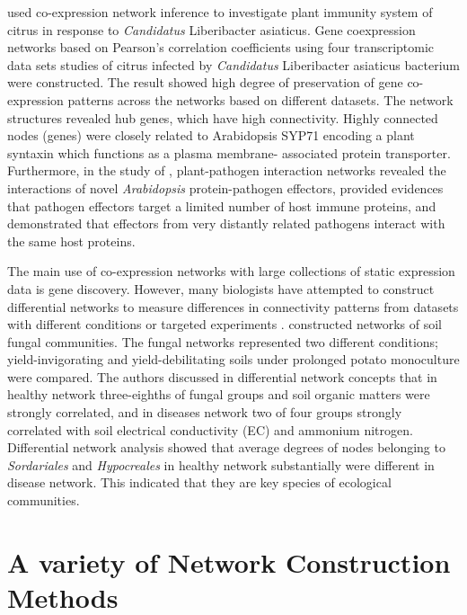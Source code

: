 \citet{Zheng2013} used co-expression network inference to investigate plant immunity system of citrus in response to \textit{Candidatus} Liberibacter asiaticus. Gene coexpression networks based on Pearson's correlation coefficients using four transcriptomic data sets studies of citrus infected by \textit{Candidatus} Liberibacter asiaticus bacterium were constructed. The result showed high degree of preservation of gene co-expression patterns across the networks based on different datasets. The network structures revealed hub genes, which have high connectivity. Highly connected nodes (genes) were closely related to Arabidopsis SYP71 encoding a plant syntaxin which functions as a plasma membrane- associated protein transporter. Furthermore, in the study of \citet{mukhtar2011independently}, plant-pathogen interaction networks revealed the interactions of novel \textit{Arabidopsis} protein-pathogen effectors, provided evidences that pathogen effectors target a limited number of host immune proteins, and demonstrated that effectors from very distantly related pathogens interact with the same host proteins. 

The main use of co-expression networks with large collections of static expression data is gene discovery. However, many biologists have attempted to construct differential networks to measure differences in connectivity patterns from datasets with different conditions or targeted experiments \citep{Toubiana:2013cv}. \citet{Lu:2013hga} constructed networks of soil fungal communities. The fungal networks represented two different conditions; yield-invigorating and yield-debilitating soils under prolonged potato monoculture were compared. The authors discussed in differential network concepts that in healthy network three-eighths of fungal groups and soil organic matters were strongly correlated, and in diseases network two of four groups strongly correlated with soil electrical conductivity (EC) and ammonium nitrogen. Differential network analysis showed that average degrees of nodes belonging to \textit{Sordariales} and \textit{Hypocreales} in healthy network substantially were different in disease network. This indicated that they are key species of ecological communities.

\section*{A variety of Network Construction Methods}

